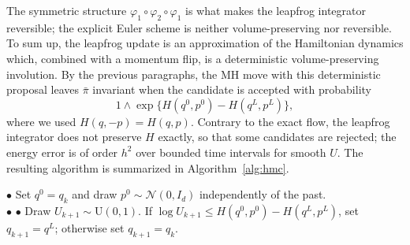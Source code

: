 \documentclass[english,graybox,envcountchap,envcountsame,sectrefs,shortlabels]{svmono}
\theoremstyle{style}
\newcommand{\gauss}{\mathcal{N}}
\newcommand{\eqsp}{}
\begin{document}
The symmetric  structure $\varphi_1\circ\varphi_2\circ\varphi_1$ is what makes the leapfrog integrator reversible; the explicit Euler scheme is neither volume-preserving nor reversible. To sum up, the leapfrog update is an approximation of the Hamiltonian dynamics which, combined with a momentum flip, is a deterministic volume-preserving involution. By the previous paragraphs, the MH move with this deterministic proposal leaves $\bar\pi$ invariant when the candidate is accepted with probability
$$
1\wedge\exp\big\{H(q^0,p^0)-H(q^L,p^L)\big\}\eqsp,
$$
where we used $H(q,-p) = H(q,p)$. Contrary to the exact flow, the leapfrog integrator does not preserve $H$ exactly, so that some candidates are rejected; the energy error is of order $h^2$ over bounded time intervals for smooth $U$. The resulting algorithm is summarized in Algorithm~\ref{alg:hmc}.

\begin{algorithm}
\caption{\label{alg:hmc}Hamiltonian Monte Carlo with leapfrog integrator}
\BlankLine
{}
{
$\bullet$ Set $q^0=q_k$ and draw $p^0\sim\gauss(0,I_d)$ independently of the past.\\
$\bullet$ 
$\bullet$ Draw $U_{k+1}\sim\mathrm{U}(0,1)$. If $\log U_{k+1}\leq H(q^0,p^0)-H(q^L,p^L)$, set $q_{k+1}=q^L$; otherwise set $q_{k+1}=q_k$.
}
\end{algorithm}
\end{document}
